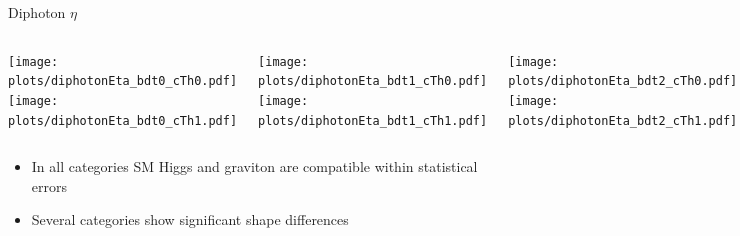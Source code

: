 \documentclass[8pt]{beamer}
\begin{document}
\begin{frame}{Diphoton $\eta$}

  \begin{block}
   
     \begin{columns}
     
      \centering
     
      \column[t]{3.0cm}
      \texttt{[image: plots/diphotonEta\_bdt0\_cTh0.pdf]} \\
      \texttt{[image: plots/diphotonEta\_bdt0\_cTh1.pdf]} 
      
      \column[t]{3.0cm}
      \texttt{[image: plots/diphotonEta\_bdt1\_cTh0.pdf]} \\
      \texttt{[image: plots/diphotonEta\_bdt1\_cTh1.pdf]}
      
      \column[t]{3.0cm}
      \texttt{[image: plots/diphotonEta\_bdt2\_cTh0.pdf]} \\
      \texttt{[image: plots/diphotonEta\_bdt2\_cTh1.pdf]}
      
      \column[t]{3.0cm}
      \texttt{[image: plots/diphotonEta\_bdt3\_cTh0.pdf]} \\
      \texttt{[image: plots/diphotonEta\_bdt3\_cTh1.pdf]}
      
    \end{columns}
  
  \end{block}

    \begin{itemize}
    \item In all categories SM Higgs and graviton are compatible within statistical errors
    \item Several categories show significant shape differences
  \end{itemize}
  
\end{frame}
\end{document}

